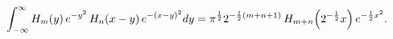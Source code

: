 \[\int_{-\infty}^{\infty}\mathop{H_{m}\/}\nolimits\!\left(y\right)e^{-y^{2}}%
\mathop{H_{n}\/}\nolimits\!\left(x-y\right)e^{-(x-y)^{2}}dy=\pi^{\frac{1}{2}}2%
^{-\frac{1}{2}(m+n+1)}\mathop{H_{m+n}\/}\nolimits\!\left(2^{-\frac{1}{2}}x%
\right)e^{-\frac{1}{2}x^{2}}.\]
